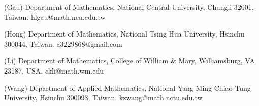 \documentclass[11pt]{article}
\numberwithin{equation}{section}
\begin{document}
\medskip\noindent
(Gau) Department of Mathematics, National Central University, Chungli 32001, Taiwan. hlgau@math.ncu.edu.tw

\medskip\noindent
(Hong) Department of Mathematics, National Tsing Hua University, Hsinchu 300044, Taiwan. a3229868@gmail.com

\medskip\noindent
(Li) Department of Mathematics, College of William \& Mary, Williamsburg, VA 23187, USA. ckli@math.wm.edu


\medskip\noindent
(Wang) Department of Applied Mathematics, National Yang Ming Chiao Tung University, Hsinchu 300093, Taiwan.
kzwang@math.nctu.edu.tw
\end{document}
